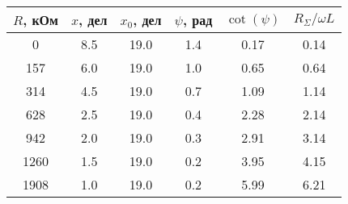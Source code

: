 \begin{tabular}{cccccc}
\toprule
$R$, кОм & $x$, дел & $x_0$, дел & $\psi$, рад & $\cot(\psi)$ & $R_\Sigma/\omega L$ \\
\midrule
0    & 8.5 & 19.0 & 1.4 & 0.17 & 0.14 \\
157  & 6.0 & 19.0 & 1.0 & 0.65 & 0.64 \\
314  & 4.5 & 19.0 & 0.7 & 1.09 & 1.14 \\
628  & 2.5 & 19.0 & 0.4 & 2.28 & 2.14 \\
942  & 2.0 & 19.0 & 0.3 & 2.91 & 3.14 \\
1260 & 1.5 & 19.0 & 0.2 & 3.95 & 4.15 \\
1908 & 1.0 & 19.0 & 0.2 & 5.99 & 6.21 \\
\bottomrule
\end{tabular}